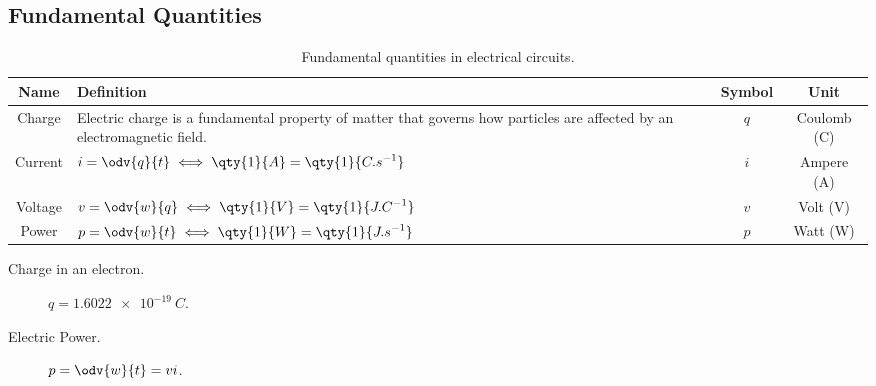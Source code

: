 \documentclass{article}
\begin{document}
\subsection{Fundamental Quantities}
\begingroup
\renewcommand{\arraystretch}{1.5}
\begin{table}[H]
    \centering
    \begin{tabular}{c >{\centering}p{} c c}
        \toprule
        \textbf{Name} & \textbf{Definition}                                                                                                      & \textbf{Symbol}           & \textbf{Unit} \\
        \midrule
        Charge        & Electric charge is a fundamental property of matter that governs how particles are affected by an electromagnetic field.
                      & \(q\)                                                                                                                    & Coulomb (\unit{\coulomb})                 \\
        \midrule
        Current       & \(\displaystyle i = \odv{q}{t}\iff\qty{1}{A} = \qty{1}{C.s^{-1}}\)
                      & \(i\)                                                                                                                    & Ampere (\unit{\ampere})                   \\
        \midrule
        Voltage       & \(\displaystyle v = \odv{w}{q}\iff\qty{1}{V} = \qty{1}{J.C^{-1}}\)
                      & \(v\)                                                                                                                    & Volt (\unit{\volt})                       \\
        \midrule
        Power         & \(\displaystyle p = \odv{w}{t}\iff\qty{1}{W} = \qty{1}{J.s^{-1}}\)
                      & \(p\)                                                                                                                    & Watt (\unit{\watt})                       \\
        \bottomrule
    \end{tabular}
    \caption{Fundamental quantities in electrical circuits.}
\end{table}
\endgroup
\begin{description}
    \item[Charge in an electron.] \(q = \qty{1.6022e-19}{C}\).
    \item[Electric Power.] \(\displaystyle p = \odv{w}{t} = vi\).
\end{description}
\end{document}
